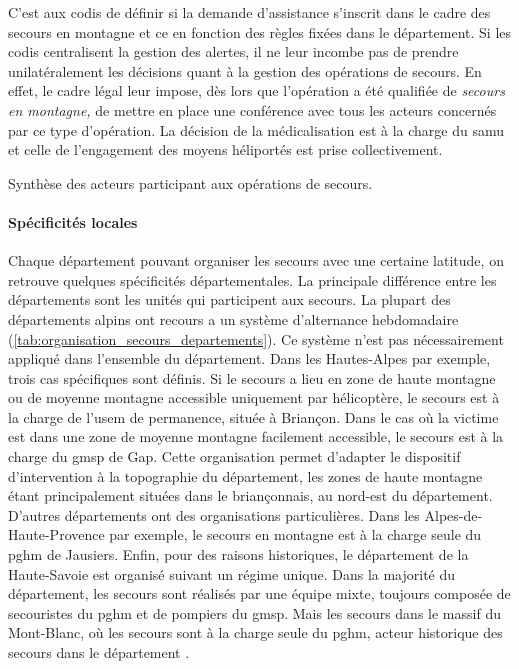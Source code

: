 C'est aux \ac{codis} de définir si la demande d'assistance s'inscrit
dans le cadre des secours en montagne et ce en fonction des règles
fixées dans le département. Si les \ac{codis} centralisent la gestion
des alertes, il ne leur incombe pas de prendre unilatéralement les
décisions quant à la gestion des opérations de secours. En effet, le
cadre légal leur impose, dès lors que l’opération a été qualifiée de
\emph{secours en montagne,} de mettre en place une conférence avec
tous les acteurs concernés par ce type d'opération. La décision de la
médicalisation est à la charge du \ac{samu} et celle de l'engagement
des moyens héliportés est prise collectivement.

\begin{table}
  \centering
  
  \caption{Synthèse des acteurs participant aux opérations de
    secours.}
  \label{tbl:org_sec}
\end{table}

\paragraph{Spécificités locales}

Chaque département pouvant organiser les secours avec une certaine
latitude, on retrouve quelques spécificités départementales. La
principale différence entre les départements sont les unités qui
participent aux secours. La plupart des départements alpins ont
recours a un système d'alternance hebdomadaire
(\autoref{tab:organisation_secours_departements}). Ce système n'est
pas nécessairement appliqué dans l'ensemble du département. Dans les
Hautes-Alpes par exemple, trois cas spécifiques sont définis. Si le
secours a lieu en zone de haute montagne ou de moyenne montagne
accessible uniquement par hélicoptère, le secours est à la charge de
l'\ac{usem} de permanence, située à Briançon. Dans le cas où la
victime est dans une zone de moyenne montagne facilement accessible,
le secours est à la charge du \ac{gmsp} de Gap. Cette organisation
permet d'adapter le dispositif d’intervention à la topographie du
département, les zones de haute montagne étant principalement situées
dans le briançonnais, au nord-est du département. D'autres
départements ont des organisations particulières. Dans les
Alpes-de-Haute-Provence par exemple, le secours en montagne est à la
charge seule du \ac{pghm} de Jausiers. Enfin, pour des raisons
historiques, le département de la Haute-Savoie est organisé suivant un
régime unique. Dans la majorité du département, les secours sont
réalisés par une équipe mixte, toujours composée de secouristes du
\ac{pghm} et de pompiers du \ac{gmsp}. Mais les secours dans le massif
du Mont-Blanc, où les secours sont à la charge seule du \ac{pghm},
acteur historique des secours dans le département
\autocite{Halle2007,Boillot2017}.

